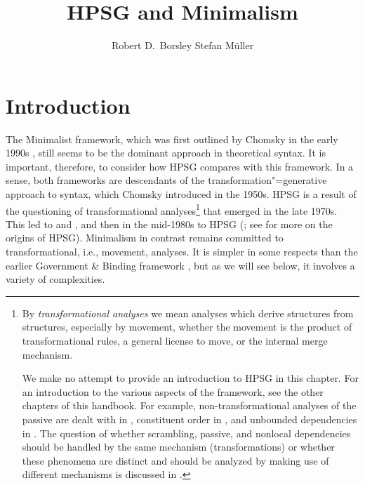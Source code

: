 \documentclass[output=paper
	        ,collection
	        ,collectionchapter
 	        ,biblatex
                ,babelshorthands
                ,newtxmath
                ,draftmode
                ,colorlinks, citecolor=brown
]{langscibook}
\author{%
	Robert D.\ Borsley\affiliation{University of Essex and Bangor University}%
	\lastand Stefan Müller\affiliation{Humboldt-Universität zu Berlin}%
}
\title{HPSG and Minimalism}
\begin{document}
\maketitle
\label{chap-minimalism}

\section{Introduction}
\label{sec:min-intro}


The Minimalist framework, which was first outlined by Chomsky in the early 1990s
\citep{Chomsky93b-u,Chomsky95a-u}, still seems to be the dominant approach in theoretical syntax. It is
important, therefore, to consider how HPSG compares with this framework. In a sense, both frameworks
are descendants of the transformation"=generative approach to syntax, which Chomsky introduced in the
1950s. HPSG is a result of the questioning of transformational analyses\footnote{%
By \emph{transformational analyses} we mean analyses which derive structures from structures, especially
by movement, whether the movement is the product of transformational rules, a general license to
move, or the internal merge mechanism. 

We make no attempt to provide an introduction to HPSG in this chapter. For an introduction to the
various aspects of the framework, see the other chapters of this handbook. For example,
non-transformational analyses of the passive are dealt with in ,
constituent order in , and unbounded dependencies in . The
question of whether scrambling, passive, and nonlocal dependencies should be handled by the same
mechanism (\eg transformations) or whether these phenomena are distinct and should be analyzed by
making use of different mechanisms is discussed in .%
} that emerged in the late
1970s. This led to  \citep{BK82a} and  \citep{GKPS85a}, and then in
the mid-1980s to HPSG (\citealt{ps}; see  for more on the origins of HPSG). Minimalism in contrast
remains committed to transformational, i.e., movement, analyses. It is simpler in some respects than
the earlier Government \& Binding framework \citep{Chomsky81a}, but as we will see below, it involves a variety of
complexities. 
\end{document}
